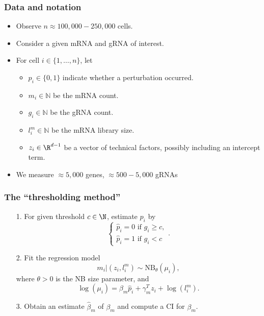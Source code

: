 \documentclass{beamer}
\begin{document}
\begin{frame}
\frametitle{Data and notation}

\begin{itemize}
\item Observe $n \approx 100,000 - 250,000$ cells.
\item Consider a given mRNA and gRNA of interest.
\item For cell $i \in \{1, \dots, n\}$, let 
\begin{itemize}
\item $p_i \in \{0, 1\}$ indicate whether a perturbation occurred. 
\item $m_i \in \mathbb{N}$ be the mRNA count.
\item $g_i \in \mathbb{N}$ be the gRNA count.
\item $l^m_i \in \mathbb{N}$ be the mRNA library size.
\item $z_i \in \R^{d-1}$ be a vector of technical factors, possibly including an intercept term.
\end{itemize}
\item We measure $\approx5,000$ genes, $\approx500 - 5,000$ gRNAs
\end{itemize}
\end{frame}

\begin{frame}
\frametitle{The ``thresholding method''}

\begin{itemize}
\item[1.] For given threshold $c \in \N$, estimate $p_i$ by $$ \begin{cases} \hat{p}_i = 0 \textrm{ if } g_i \geq c, \\ \hat{p}_i = 1 \textrm{ if } g_i < c \end{cases}.$$
\item[2.] Fit the regression model \cite{Sarkar2021}
$$ m_i | \left( z_i, l^m_i \right) \sim \textrm{NB}_\theta(\mu_i),$$ where $\theta >0$ is the NB size parameter, and $$\log\left(\mu_i\right) = \beta_m \hat{p}_i + \gamma^T_m z_i + \log\left( l_i^m\right).$$
\item[3.] Obtain an estimate $\hat{\beta}_m$ of $\beta_m$ and compute a CI for $\beta_m$.
\end{itemize}
\end{frame}
\end{document}
